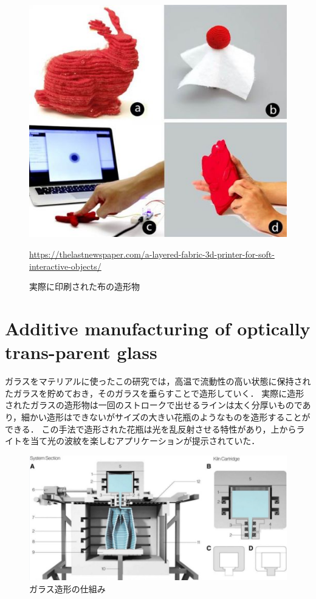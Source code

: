 \begin{figure}[H]
  \centering
  \includegraphics[width=10truecm]{./fig/ALayered.jpg}
  \caption{実際に印刷された布の造形物}
  \url{https://thelastnewspaper.com/a-layered-fabric-3d-printer-for-soft-interactive-objects/} %
  \label{fig:ferret}
\end{figure}



\section{ Additive manufacturing of optically trans-parent glass\cite{d}}
\label{sec:enum}
ガラスをマテリアルに使ったこの研究では，高温で流動性の高い状態に保持されたガラスを貯めておき，そのガラスを垂らすことで造形していく．
実際に造形されたガラスの造形物は一回のストロークで出せるラインは太く分厚いものであり，細かい造形はできないがサイズの大きい花瓶のようなものを造形することができる．
この手法で造形された花瓶は光を乱反射させる特性があり，上からライトを当て光の波紋を楽しむアプリケーションが提示されていた．

\begin{figure}[H]
  \centering
  \includegraphics[width=12.5truecm]{./fig/Additive2.jpg}
  \caption{ガラス造形の仕組み}
  \label{fig:ferret}
\end{figure}


